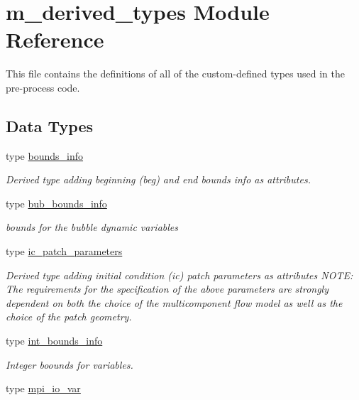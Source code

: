\hypertarget{namespacem__derived__types}{}\section{m\+\_\+derived\+\_\+types Module Reference}
\label{namespacem__derived__types}


This file contains the definitions of all of the custom-\/defined types used in the pre-\/process code.  


\subsection*{Data Types}
\begin{DoxyCompactItemize}
\item 
type \hyperlink{structm__derived__types_1_1bounds__info}{bounds\+\_\+info}
\begin{DoxyCompactList}\small\item\em Derived type adding beginning (beg) and end bounds info as attributes. \end{DoxyCompactList}\item 
type \hyperlink{structm__derived__types_1_1bub__bounds__info}{bub\+\_\+bounds\+\_\+info}
\begin{DoxyCompactList}\small\item\em bounds for the bubble dynamic variables \end{DoxyCompactList}\item 
type \hyperlink{structm__derived__types_1_1ic__patch__parameters}{ic\+\_\+patch\+\_\+parameters}
\begin{DoxyCompactList}\small\item\em Derived type adding initial condition (ic) patch parameters as attributes N\+O\+TE\+: The requirements for the specification of the above parameters are strongly dependent on both the choice of the multicomponent flow model as well as the choice of the patch geometry. \end{DoxyCompactList}\item 
type \hyperlink{structm__derived__types_1_1int__bounds__info}{int\+\_\+bounds\+\_\+info}
\begin{DoxyCompactList}\small\item\em Integer boounds for variables. \end{DoxyCompactList}\item 
type \hyperlink{structm__derived__types_1_1mpi__io__var}{mpi\+\_\+io\+\_\+var}
\item 

\end{DoxyCompactItemize}
